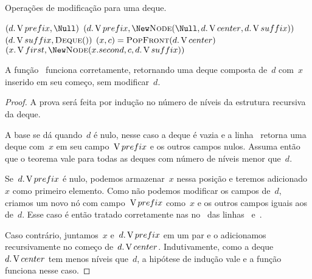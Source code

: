 \documentclass[main.tex]{subfiles}
\begin{document}
\begin{algorithm}
\caption{Operações de modificação para uma deque.} \label{lst:deque_mod}
\begin{algorithmic}[1]

        \State \Return \New {} \label{line:dm:puf1}
     \label{line:dm:puf2}
        \State \Return \New {}\label{line:dm:puf2_1}
    \Else
        \State \Return \New {} \label{line:dm:puf3}
    \EndIf
\EndFunction

     \label{line:dm:pof0}
        \State \Return $(d.\V{prefix}, \Null)$
     \label{line:dm:pof1}
        \State \Return $(d.\V{prefix}, \New \Call{Node}{\Null, d.\V{center}, d.\V{suffix}})$ \label{line:dm:pof1_2}
        \State \Return $(d.\V{suffix}, \Call{Deque}{\null})$ \label{line:dm:pof2}
    \Else
        \State $(x, c) = \Call{PopFront}{d.\V{center}}$
        \State \Return $(x.\V{first}, \New \Call{Node}{x.second, c, d.\V{suffix}})$ \label{line:dm:pof3}
    \EndIf
\EndFunction

\end{algorithmic}
\end{algorithm}

\begin{proposition}
A função~ funciona corretamente, retornando uma deque composta de~$d$ com~$x$ inserido em seu começo, sem modificar~$d$.
\end{proposition}

\begin{proof}
A prova será feita por indução no número de níveis da estrutura recursiva da deque.

A base se dá quando~$d$ é nulo, nesse caso a deque é vazia e a linha~ retorna uma deque com~$x$ em seu campo~$\operatorname{V}{prefix}$ e os outros campos nulos. Assuma então que o teorema vale para todas as deques com número de níveis menor que~$d$.

Se~$d.\operatorname{V}{prefix}$ é nulo, podemos armazenar~$x$ nessa posição e teremos adicionado~$x$ como primeiro elemento. Como não podemos modificar os campos de~$d$, criamos um novo nó com campo~$\operatorname{V}{prefix}$ como~$x$ e os outros campos iguais aos de~$d$. Esse caso é então tratado corretamente nas no~ das linhas~ e~.

Caso contrário, juntamos~$x$ e~$d.\operatorname{V}{prefix}$ em um par e o adicionamos recursivamente no começo de~$d.\operatorname{V}{center}$. Indutivamente, como a deque~$d.\operatorname{V}{center}$ tem menos níveis que~$d$, a hipótese de indução vale e a função funciona nesse caso.
\end{proof}
\end{document}
